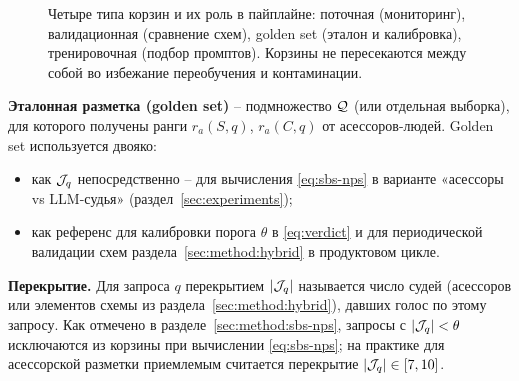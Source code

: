 \begin{figure}[htbp]
    \centering
    \caption{Четыре типа корзин и их роль в пайплайне: поточная
    (мониторинг), валидационная (сравнение схем), golden set (эталон и
    калибровка), тренировочная (подбор промптов). Корзины не
    пересекаются между собой во избежание переобучения и контаминации.}
    \label{fig:baskets}
\end{figure}

\textbf{Эталонная разметка (golden set)} -- подмножество $\mathcal{Q}$ (или
отдельная выборка), для которого получены ранги $r_a(S,q)$, $r_a(C,q)$ от
асессоров-людей.
Golden set используется двояко:
\begin{itemize}
    \item как $\mathcal{J}_q$ непосредственно -- для вычисления
        \eqref{eq:sbs-nps} в варианте «асессоры vs LLM-судья»
        (раздел~\ref{sec:experiments});
    \item как референс для калибровки порога $\theta$ в
        \eqref{eq:verdict} и для периодической валидации схем
        раздела~\ref{sec:method:hybrid} в продуктовом цикле.
\end{itemize}

\textbf{Перекрытие.}
Для запроса $q$ перекрытием $\left\lvert\mathcal{J}_q\right\rvert$ называется число судей
(асессоров или элементов схемы из раздела~\ref{sec:method:hybrid}),
давших голос по этому запросу.
Как отмечено в разделе~\ref{sec:method:sbs-nps}, запросы с
$\left\lvert\mathcal{J}_q\right\rvert < \theta$ исключаются из корзины при вычислении
\eqref{eq:sbs-nps}; на практике для асессорской разметки приемлемым
считается перекрытие $\left\lvert\mathcal{J}_q\right\rvert \in [7, 10]$.


